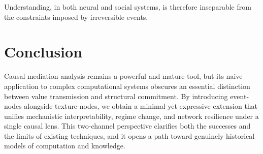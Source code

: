 \documentclass[11pt]{article}
\begin{document}
Understanding, in both neural and social systems, is therefore inseparable from the constraints imposed by irreversible events.

\section{Conclusion}

Causal mediation analysis remains a powerful and mature tool, but its naive application to complex computational systems obscures an essential distinction between value transmission and structural commitment. By introducing event-nodes alongside texture-nodes, we obtain a minimal yet expressive extension that unifies mechanistic interpretability, regime change, and network resilience under a single causal lens. This two-channel perspective clarifies both the successes and the limits of existing techniques, and it opens a path toward genuinely historical models of computation and knowledge.
\end{document}
